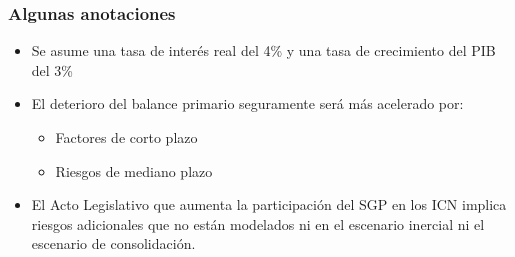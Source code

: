 \begin{frame}
  \frametitle{Algunas anotaciones}
  \begin{itemize}
    \item Se asume una tasa de interés real del 4\% y una tasa de crecimiento del PIB del 3\% 
    \item El deterioro del balance primario seguramente será más acelerado por:
    \begin{itemize}
        \item Factores de corto plazo
        \item Riesgos de mediano plazo
    \end{itemize}
    \item El Acto Legislativo que aumenta la participación del SGP en los ICN implica riesgos adicionales que no están modelados ni en el escenario inercial ni el escenario de consolidación.
  \end{itemize}
\end{frame}